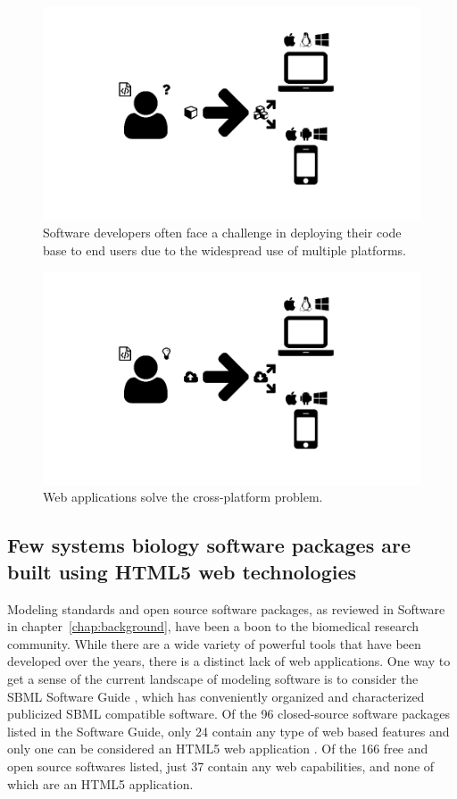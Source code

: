 \begin{figure}
  \centering
  \includegraphics[width=\textwidth,natwidth=610,natheight=642]{images/deployment-problem.png}
  \caption{Software developers often face a challenge in deploying their code base to end users due to the widespread use of multiple platforms.}
  \label{fig:deployment-problem}
\end{figure}
\begin{figure}
  \centering
  \includegraphics[width=\textwidth,natwidth=610,natheight=642]{images/web-app-deployment.png}
  \caption{Web applications solve the cross-platform problem.}
  \label{fig:web-app-deployment}
\end{figure}

\subsection{Few systems biology software packages are built using HTML5 web technologies}
Modeling standards and open source software packages, as reviewed in  Software in chapter~\ref{chap:background}, have been a boon to the biomedical research community.
While there are a wide variety of powerful tools that have been developed over the years, there is a distinct lack of web applications.
One way to get a sense of the current landscape of modeling software is to consider the SBML Software Guide \autocite{sbml2014software}, which has conveniently organized and characterized publicized SBML compatible software.
Of the 96 closed-source software packages listed in the Software Guide, only 24 contain any type of web based features and only one can be considered an HTML5 web application \autocite{olivier2004web}.
Of the 166 free and open source softwares listed, just 37 contain any web capabilities, and none of which are an HTML5 application.
